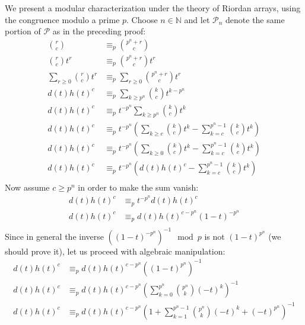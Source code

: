 \documentclass[10pt,a4paper]{article} %
\begin{document}
    We present a modular characterization under the theory of Riordan arrays, using the
    congruence modulo a prime $p$. Choose $n\in\mathbb{N}$ and let $\mathcal{P}_n$ denote the
    same portion of $\mathcal{P}$ as in the preceding proof:
      \begin{displaymath}
          \begin{split}
                {{r} \choose {c}} &\equiv_p {{p^n+r} \choose {c}} \\
                {{r} \choose {c}}t^r &\equiv_p {{p^n+r} \choose {c}}t^r \\
                \sum_{r\geq 0}{{{r} \choose {c}}t^r} &\equiv_p \sum_{r\geq 0}{{{p^n+r} \choose {c}}t^r} \\
                d(t)h(t)^{c} &\equiv_p \sum_{k\geq p^n}{{{k} \choose {c}}t^{k-p^n}} \\
                d(t)h(t)^{c} &\equiv_p t^{-p^n}\sum_{k\geq p^n}{{{k} \choose {c}}t^{k}} \\
                d(t)h(t)^{c} &\equiv_p t^{-p^n}\left(
                    \sum_{k\geq c}{{{k} \choose {c}}t^{k}}-\sum_{k=c}^{p^n -1}{{{k} \choose {c}}t^{k}}\right) \\
                d(t)h(t)^{c} &\equiv_p t^{-p^n}\left(
                    \sum_{k\geq 0}{{{k} \choose {c}}t^{k}}-\sum_{k=c}^{p^n -1}{{{k} \choose {c}}t^{k}}\right) \\
                d(t)h(t)^{c} &\equiv_p t^{-p^n}\left(d(t)h(t)^{c} -\sum_{k=c}^{p^n -1}{{{k} \choose {c}}t^{k}}\right) \\
          \end{split}
      \end{displaymath}
    Now assume $c \geq p^n$ in order to make the sum vanish:
      \begin{displaymath}
          \begin{split}
                d(t)h(t)^{c} &\equiv_p t^{-p^n} d(t)h(t)^{c} \\
                d(t)h(t)^{c} &\equiv_p d(t)h(t)^{c-p^n} (1-t)^{-p^n} \\
          \end{split}
      \end{displaymath}
    Since in general the inverse $\left((1-t)^{-p^n}\right)^{-1}\mod p$ is not $(1-t)^{p^n}$
    (we should prove it), let us proceed with algebraic manipulation:
      \begin{displaymath}
          \begin{split}
                d(t)h(t)^{c} &\equiv_p d(t)h(t)^{c-p^n}\left( (1-t)^{p^n}\right)^{-1} \\
                d(t)h(t)^{c} &\equiv_p d(t)h(t)^{c-p^n}\left(\sum_{k=0}^{p^n}{{{p^n} \choose {k}}(-t)^k } \right)^{-1}\\
                d(t)h(t)^{c} &\equiv_p d(t)h(t)^{c-p^n}\left(
                    1 + \sum_{k=1}^{p^n -1}{{{p^n} \choose {k}}(-t)^k +(-t)^{p^n} }\right)^{-1} \\
          \end{split}
      \end{displaymath}
\end{document}
